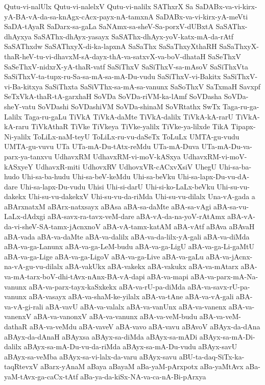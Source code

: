 {Qutu-vi-nalUlx
Qutu-vi-nalelxV
Qutu-vi-nalilx
SAThxrX
Sa
SaDABx-va-vi-kirx-yA-BA-vA-da-sa-knAgx-cAcx-payx-nA-tamxnA
SaDABx-va-vi-kirx-yA-meVti
SaDA-tAyaR
SaDarx-sa-gaLa
SaNAmx-sa-sheV-Sa-porxV-dUBxtA
SaSAThx-dhAyxya
SaSAThx-dhAyx-yasayx
SaSAThx-dhAyx-yoV-katx-mA-da-rAtf
SaSAThxdw
SaSAThxyX-di-ka-lapxnA
SaSaThx
SaSaThxyXthaRH
SaSaThxyX-thaR-heV-tu-vi-dhavxM-sA-dayx-thA-va-satxvX-va-boV-dhataH
SaSeThxV
SaSeThxV-nidxrX-yA-thaR-vatf
SaSiThxV
SaSiThxV-sa-mAsoV
SaSiThxVta
SaSiThxV-ta-tupx-ru-Sa-sa-mA-sa-mA-Du-vudu
SaSiThxV-vi-Bakitx
SaSiThxV-vi-Ba-kitxya
SaSiThxta
SaSiVThx-sa-mA-sa-vanunx
SaSoThxV
SaTxmaH
Savxpf
SeTxVkA-thaR-tA-garxhaH
SoVDa
SoVDa-riVM-ka-lAmf
SoVDasha
SoVDa-sheY-vatu
SoVDashi
SoVDashiVM
SoVDa-shinaM
SoVRtathx
SwTx
Taga-ru-ga-Lalilx
Taga-ru-gaLu
TiVkA
TiVkA-daMte
TiVkA-dalilx
TiVkA-kA-rarU
TiVkA-kA-raru
TiVkAthaR
TiVke
TiVkeya
TiVke-yalilx
TiVke-ya-lilxde
TikA
Tipapx-Ni-yalilx
ToLiLx-naM-teyU
ToLiLx-ru-vu-daSeTx
ToLuLx
UMTA-gu-vudu
UMTA-gu-vuvu
UTa
UTa-mA-Du-tAtx-reMdu
UTa-mA-Duva
UTa-mA-Du-va-parx-ya-tanxvu
UdhavxRM
UdhavxRM-vi-moV-kASxya
UdhavxRM-vi-moV-kASxyeY
UdhavxR-miti
UdhovxRV
UdhovxVR-cACxvXsiV
UhegU
Uhi-sa-ba-hudo
Uhi-sa-ba-hudu
Uhi-sa-beV-keMdu
Uhi-sa-beVku
Uhi-sa-lapx-Du-vu-dA-dare
Uhi-sa-lapx-Du-vudu
Uhisi
Uhi-si-darU
Uhi-si-ko-LaLx-beVku
Uhi-su-vu-dakekx
Uhi-su-vu-dakekxV
Uhi-su-vu-da-riMda
Uhi-su-vu-dilalx
Una-vA-gada
a
aBArxnatxM
aBArx-natxsayx
aBAsa
aBA-sa-daMte
aBA-sa-vAgi
aBA-sa-vu-LaLx-dAdxgi
aBA-savx-ra-tavx-veM-dare
aBA-vA-da-na-yoV-rAtAmx
aBA-vA-da-vi-sheV-SA-tamx-jAcnxnoV
aBA-vA-tamx-katAM
aBA-vAtf
aBAva
aBAvaH
aBA-vada
aBA-va-daMte
aBA-va-dalilx
aBA-va-da-lilx-yA-gali
aBA-va-diMda
aBA-va-ga-Lanunx
aBA-va-ga-LeM-budu
aBA-va-ga-LigU
aBA-va-ga-Li-gaMtU
aBA-va-ga-Lige
aBA-va-ga-LigoV
aBA-va-ga-Live
aBA-va-gaLu
aBA-va-jAcnx-na-vA-gu-vu-dilalx
aBA-vakUkx
aBA-vakekx
aBA-vakukx
aBA-va-mAtarx
aBA-va-mA-tarx-boV-dhi-tAvx-nAnx-BA-vA-dapi
aBA-va-mapi
aBA-va-parx-mA-Na-vanunx
aBA-va-parx-tayx-kaSxkekx
aBA-va-rU-pa-diMda
aBA-va-savx-rU-pa-vanunx
aBA-vasayx
aBA-va-shaM-ke-yilalx
aBA-va-tAne
aBA-va-vA-gali
aBA-va-vA-gi-rali
aBA-vavU
aBA-va-valalx
aBA-va-vanUnx
aBA-va-vanenx
aBA-va-vanenxV
aBA-va-vanonxV
aBA-va-vanunx
aBA-va-veM-budu
aBA-va-veM-dathaR
aBA-va-veMdu
aBA-vaveV
aBA-vavo
aBA-vavu
aBAvoV
aBAyx-da-dAna
aBAyx-da-dAnaH
aBAyxsa
aBAyx-sa-diMda
aBAyx-sa-mADi
aBAyx-sa-mA-Di-dalilx
aBAyx-sa-mA-Du-vu-da-riMda
aBAyx-sa-mA-Du-vudu
aBAyx-savU
aBAyx-sa-veMba
aBAyx-sa-vi-lalx-da-varu
aBAyx-savu
aBU-ta-daq-SiTx-ka-taqRtevxV
aBarx-yAnaM
aBaya
aBayaM
aBa-yaM-pArxpotx
aBa-yaMtAvx
aBa-yaM-tAvx-ga-caCx-tAtf
aBa-ya-da-kiSx-NA-va-ca-nA-Bi-pArxya
}
